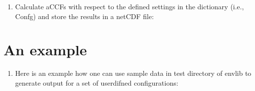\documentclass[a4paper,11pt,english]{sphinxmanual}
\begin{document}
\begin{sphinxVerbatim}[commandchars=\\\{\}]
        
\end{sphinxVerbatim}
\begin{enumerate}
%
\setcounter{enumi}{5}
\item {} 
Calculate aCCFs with respect to the defined settings in the dictionary (i.e., Confg) and store the results in a netCDF file:

\end{enumerate}

\begin{sphinxVerbatim}[commandchars=\\\{\}]
\end{sphinxVerbatim}


\chapter{An example}
\label{\detokenize{index:an-example}}\begin{enumerate}
%
\setcounter{enumi}{-1}
\item {} 
Here is an example how one can use sample data in test directory of envlib to generate output for a set of user\sphinxhyphen{}difned configurations:

\end{enumerate}
\end{document}
